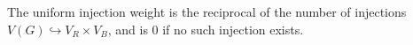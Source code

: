 \begin{definition}
The uniform injection weight is the reciprocal of the number of injections
\(V(G)\hookrightarrow V_R\times V_B\), and is \(0\) if no such injection
exists.
\end{definition}
